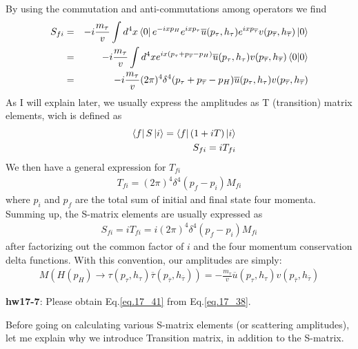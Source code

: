 \documentclass[12pt]{article}
\begin{document}
  By using the commutation and anti-commutations among operators we find
\begin{eqnarray}
  S_{fi}
  &=& -i\frac{m_\tau}{v} \int d^4 x
  \bra{0} e^{-ix p_H}
      e^{ ix p_\tau} {\overline u}(p_\tau,h_\tau)
      e^{ ix p_{\overline \tau}} v(p_{\overline \tau},h_{\overline \tau}) \ket{0} \\
      &=&-i\frac{m_\tau}{v} \int d^4 x
      e^{ix(p_\tau+p_{\overline \tau}-p_H)}
      {\overline u}(p_\tau,h_\tau) v(p_{\overline \tau},h_{\overline \tau})  \bra{0}\ket{0} \\
      &=& -i\frac{m_\tau}{v} (2\pi)^4 \delta^4( p_\tau+p_{\overline \tau}-p_H )
      {\overline u}(p_\tau,h_\tau) v(p_{\overline \tau},h_{\overline \tau})  \label{eq.17_41}
\end{eqnarray}
  As I will explain later, we usually express the amplitudes
  as T (transition) matrix elements, wich is defined as
\begin{eqnarray}
  &&\bra{f}S\ket{i}=\bra{f}(1+iT)\ket{i} \label{eq.17_42a}\\
  &&S_{fi} =          i T_{fi}\label{eq.17_42b}
\end{eqnarray}
  We then have a general expression for $T_{fi}$
\begin{eqnarray}
  T_{fi} = (2\pi)^4 \delta^4( p_f - p_i ) M_{fi} \label{eq.17_43}
\end{eqnarray}
   where $p_i$ and $p_f$ are the total sum of initial and final state four
  momenta.  Summing up, the S-matrix elements are usually expressed as
\begin{eqnarray}
  S_{fi} = i T_{fi}
             = i (2\pi)^4 \delta^4( p_f - p_i ) M_{fi} \label{eq.17_44}
\end{eqnarray}
   after factorizing out the common factor of $i$ and the four momentum
  conservation delta functions.  With this convention, our amplitudes
  are simply:
\begin{eqnarray}
  M(H(p_H) \to \tau(p_\tau,h_\tau) {\overline \tau}(p_{\overline \tau},h_{\overline \tau}))
  = -\frac{m_\tau}{v} {\overline u}(p_\tau,h_\tau) v(p_{\overline \tau},h_{\overline \tau}) \label{eq.17_45}
\end{eqnarray}
  
{\bf hw17-7}: Please obtain Eq.\ref{eq.17_41} from Eq.\ref{eq.17_38}.

  Before going on calculating various S-matrix elements (or scattering
  amplitudes), let me explain why we introduce Transition matrix, in
  addition to the S-matrix.
\end{document}
